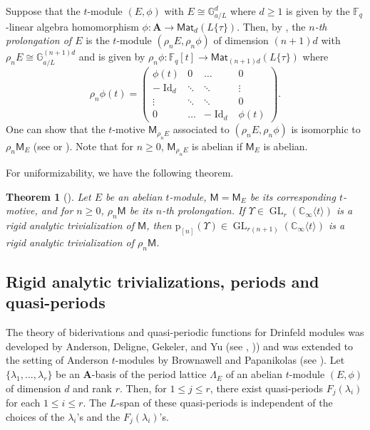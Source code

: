 \documentclass[10pt,a4paper]{amsart}
\theoremstyle{plain} %
\newtheorem{Theorem}{Theorem}[section]
\theoremstyle{definition}
\theoremstyle{remark}
\newcommand{\CC}{\mathbb{C}}
\newcommand{\FF}{\mathbb{F}}
\newcommand{\GG}{\mathbb{G}}
\newcommand{\bA}{\mathbf{A}}
\newcommand{\Id}{\operatorname{Id}}
\newcommand{\Fq}{\FF_{\!q}}  %
\newcommand{\Mat}{\mathsf{Mat}}
\newcommand{\GL}{\operatorname{GL}}
\newcommand{\KI}{\mathbb{K}_{\infty}}  %
\newcommand{\CI}{\CC_{\infty}}  %
\newcommand{\cs}[1]{\langle #1 \rangle} %
\newcommand{\mot}{\mathsf{M}}  %
\newcommand{\prol}[1]{\mathrm{p}_{[#1]}}
\numberwithin{equation}{subsection}
\begin{document}
Suppose that the $t$-module $(E, \phi)$ with $E \cong \GG_{a/L}^d$ where $d\geq 1$ is given by the $\Fq$-linear algebra homomorphism $\phi: \bA \rightarrow \Mat_d(L\{\tau\})$. Then, by \cite[Theorem~5.2]{am:ptmaip}, the \emph{$n$-th prolongation of $E$} is the $t$-module $(\rho_nE, \rho_n\phi)$ of dimension $(n+1)d$ with $\rho_n E \cong \GG_{a/L}^{(n+1)d}$ and is given by $\rho_n\phi: \Fq[t] \rightarrow \Mat_{(n+1)d}(L\{\tau\})$ where
\[
\rho_n\phi(t)= \begin{pmatrix}
\phi(t) & 0 & \dots & 0 \\
-\Id_d &\ddots &\ddots & \vdots\\
\vdots&\ddots &\ddots &  0\\
0 & \dots & -\Id_d & \phi(t)
\end{pmatrix}.
\]
One can show that the $t$-motive $\mot_{\rho_n E}$ associated to $(\rho_nE, \rho_n\phi)$ is isomorphic to $\rho_n \mot_E$ (see  \cite[Theorem~5.2]{am:ptmaip} or \cite[Proposition~5.2.11]{cn-mp:hpqpam}). 
Note that for $n \geq 0$, 
$\mot_{\rho_n E}$ is abelian if $\mot_E$ is abelian. 

For uniformizability, we have the following theorem.

\begin{Theorem}[{\cite[Proof of Theorem~3.6(a)]{am:ptmaip}}]\label{T:RATpro}
 Let $E$ be an abelian $t$-module, $\mot=\mot_E$ be its corresponding $t$-motive, and for $n \geq 0$, $\rho_n \mot$ be its $n$-th prolongation. If $\Upsilon \in \GL_{r}(\CI\cs{t})$ is a rigid analytic trivialization of $\mot$, then $\prol{n}(\Upsilon) \in \GL_{r(n+1)}(\CI\cs{t})$ is a rigid analytic trivialization of $\rho_n \mot$. 
\end{Theorem}


 


\subsection{Rigid analytic trivializations, periods and quasi-periods}\label{SS:RatPeriodsTractable}

The theory of biderivations and quasi-periodic functions for Drinfeld modules  was developed by Anderson, Deligne, Gekeler, and Yu (see \cite{MR1018059}, \cite{jy:opaqpodm})) and was extended to the setting of Anderson $t$-modules by Brownawell and Papanikolas (see \cite{db-mp:ligvpc}).
Let $\{\lambda_1, \dots, \lambda_r\}$ be an $\bA$-basis of the period lattice $\Lambda_{E}$ of an abelian $t$-module $(E, \phi)$ of dimension $d$ and rank $r$. Then, for $1\leq j \leq r$, there exist quasi-periods $F_{j}(\lambda_i)$ for each $1\leq i \leq r$. The $L$-span of these quasi-periods is independent of the choices of the $\lambda_i$'s and the $F_{j}(\lambda_i)$'s. 
\end{document}
